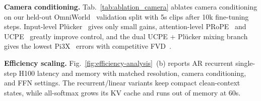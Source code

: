 

\noindent\textbf{Camera conditioning.}
Tab.~\ref{tab:ablation_camera} ablates camera conditioning on our held-out OmniWorld~\citep{omniworld} validation split with 5s clips after 10k fine-tuning steps. Input-level Pl\"ucker~\citep{plucker_lfn} gives only small gains, attention-level PRoPE~\citep{li2025cameras} and UCPE~\citep{ucpe} greatly improve control, and the dual UCPE + Pl\"ucker mixing branch gives the lowest Pi3X~\citep{pi3x} errors with competitive FVD~\citep{unterthiner2018towards}.



\noindent\textbf{Efficiency scaling.}
Fig.~\ref{fig:efficiency-analysis}~(b) reports AR recurrent single-step H100 latency and memory with matched resolution, camera conditioning, and FFN settings. The recurrent/linear variants keep compact clean-context states, while all-softmax grows its KV cache and runs out of memory at 60s.




